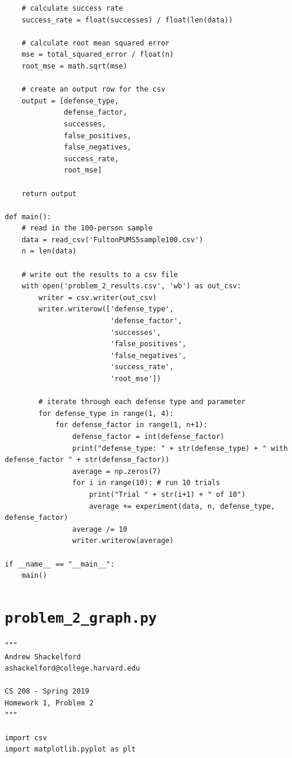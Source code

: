 \documentclass[12pt]{article}
\def\cl{\lstinline}
\begin{document}
\begin{appendices}
\begin{lstlisting}
    # calculate success rate
    success_rate = float(successes) / float(len(data))

    # calculate root mean squared error
    mse = total_squared_error / float(n)
    root_mse = math.sqrt(mse)

    # create an output row for the csv
    output = [defense_type,
              defense_factor,
              successes,
              false_positives,
              false_negatives,
              success_rate,
              root_mse]

    return output

def main():
    # read in the 100-person sample
    data = read_csv('FultonPUMS5sample100.csv')
    n = len(data)

    # write out the results to a csv file
    with open('problem_2_results.csv', 'wb') as out_csv:
        writer = csv.writer(out_csv)
        writer.writerow(['defense_type',
                         'defense_factor',
                         'successes',
                         'false_positives',
                         'false_negatives',
                         'success_rate',
                         'root_mse'])

        # iterate through each defense type and parameter
        for defense_type in range(1, 4):
            for defense_factor in range(1, n+1):
                defense_factor = int(defense_factor)
                print("defense_type: " + str(defense_type) + " with defense_factor " + str(defense_factor))
                average = np.zeros(7)
                for i in range(10): # run 10 trials
                    print("Trial " + str(i+1) + " of 10")
                    average += experiment(data, n, defense_type, defense_factor)
                average /= 10
                writer.writerow(average)

if __name__ == "__main__":
    main()
\end{lstlisting}

\newpage

\section{\cl{problem_2_graph.py}}
\label{appendix:problem_2_graph}

\begin{lstlisting}
"""
Andrew Shackelford
ashackelford@college.harvard.edu

CS 208 - Spring 2019
Homework 1, Problem 2
"""

import csv
import matplotlib.pyplot as plt


\end{lstlisting}
\end{appendices}
\end{document}
